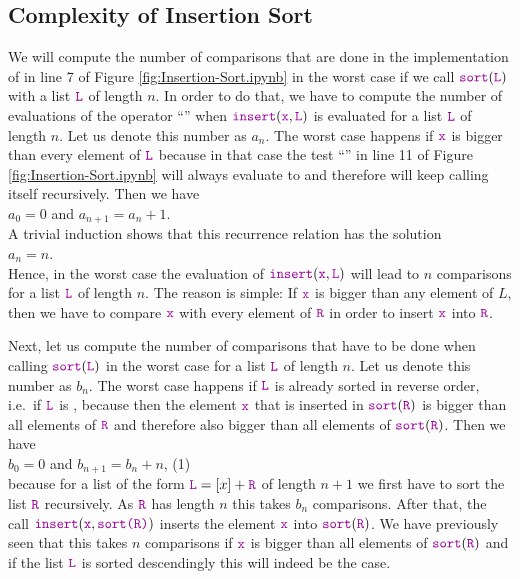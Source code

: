 \subsection{Complexity of Insertion Sort}
We will compute the number of comparisons that are done in the implementation of 
in line 7 of Figure \ref{fig:Insertion-Sort.ipynb} in the worst case if we call $\mytt{sort}(\mytt{L})$ with a list
$\mytt{L}$ of length $n$. In order to do that, 
we have to compute the number of evaluations of the operator ``\mytt{<=}'' when 
 $\mytt{insert}(\mytt{x},\mytt{L})$ is evaluated for a list $\mytt{L}$ of length $n$.  Let us denote this number as 
$a_n$.  The worst case happens if $\mytt{x}$ is bigger than every element of $\mytt{L}$ because in that case the
test ``'' in line 11 of Figure \ref{fig:Insertion-Sort.ipynb} will always evaluate to
 and therefore  will keep calling itself recursively.
Then we have
\\[0.2cm]
\hspace*{1.3cm}
$a_0 = 0$ \quad and \quad $a_{n+1} = a_n + 1$. 
\\[0.2cm]
A trivial induction shows that this recurrence relation has the solution
\\[0.2cm]
\hspace*{1.3cm} 
$a_n = n$.
\\[0.2cm]
Hence, in the worst case the evaluation of $\mytt{insert}(\mytt{x},\mytt{L})$ will lead to $n$ comparisons for a list
$\mytt{L}$ of length $n$.  The reason is simple:  If $\mytt{x}$ is bigger than any element of $L$, then we have to
compare $\mytt{x}$ with every element of $\mytt{R}$ in order to insert $\mytt{x}$ into $\mytt{R}$.

Next, let us compute the number of comparisons that have to be done when calling
$\mytt{sort}(\mytt{L})$ in the worst case for a list  $\mytt{L}$ of length $n$.  Let us denote this number as
$b_n$. The worst case happens if $\mytt{L}$ is already sorted in reverse order, i.e.~if $\mytt{L}$ is
, because then the element $\mytt{x}$ that is inserted in
$\mytt{sort}(\mytt{R})$ is bigger than all elements 
of $\mytt{R}$ and therefore also bigger than all elements of $\mytt{sort}(\mytt{R})$.  Then we have \\[0.2cm]
\hspace*{1.3cm}
 $b_0 = 0$ \quad and \quad $b_{n+1} = b_n + n$, \hspace*{\fill} (1)
\\[0.2cm]
because for a list of the form $\mytt{L} = [x] + \mytt{R}$ of length $n+1$ we first have to sort the list $\mytt{R}$
recursively.  As $\mytt{R}$ has length $n$ this takes $b_n$ comparisons.  After that, the call
$\mytt{insert}(\mytt{x}, \mytt{sort(\mytt{R})})$ 
inserts the element $\mytt{x}$ into $\mytt{sort}(\mytt{R})$.  We have previously seen that this takes $n$
comparisons if $\mytt{x}$ is bigger than all elements of $\mytt{sort}(\mytt{R})$ and if the list $\mytt{L}$ is sorted
descendingly this will indeed be the case.

